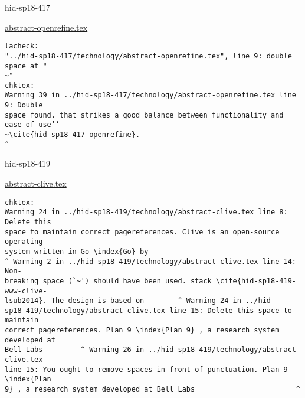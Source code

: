 

\begin{IU}

hid-sp18-417

\href{https://github.com/cloudmesh-community/hid-sp18-417/blob/master//technology/abstract-openrefine.tex}{abstract-openrefine.tex}

\begin{tiny}
\begin{verbatim}
lacheck:
"../hid-sp18-417/technology/abstract-openrefine.tex", line 9: double space at "
~"
chktex:
Warning 39 in ../hid-sp18-417/technology/abstract-openrefine.tex line 9: Double
space found. that strikes a good balance between functionality and ease of use’’
~\cite{hid-sp18-417-openrefine}.
^
\end{verbatim}
\end{tiny}
\end{IU}



\begin{IU}

hid-sp18-419

\href{https://github.com/cloudmesh-community/hid-sp18-419/blob/master//technology/abstract-clive.tex}{abstract-clive.tex}

\begin{tiny}
\begin{verbatim}
chktex:
Warning 24 in ../hid-sp18-419/technology/abstract-clive.tex line 8: Delete this
space to maintain correct pagereferences. Clive is an open-source operating
system written in Go \index{Go} by
^ Warning 2 in ../hid-sp18-419/technology/abstract-clive.tex line 14: Non-
breaking space (`~') should have been used. stack \cite{hid-sp18-419-www-clive-
lsub2014}. The design is based on        ^ Warning 24 in ../hid-
sp18-419/technology/abstract-clive.tex line 15: Delete this space to maintain
correct pagereferences. Plan 9 \index{Plan 9} , a research system developed at
Bell Labs         ^ Warning 26 in ../hid-sp18-419/technology/abstract-clive.tex
line 15: You ought to remove spaces in front of punctuation. Plan 9 \index{Plan
9} , a research system developed at Bell Labs                        ^
\end{verbatim}
\end{tiny}
\end{IU}



